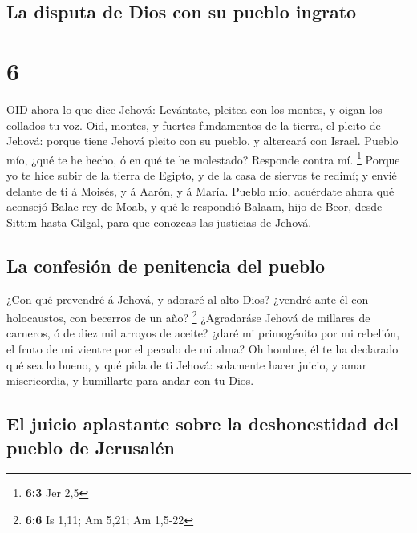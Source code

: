 \hypertarget{la-disputa-de-dios-con-su-pueblo-ingrato}{%
\subsection{La disputa de Dios con su pueblo
ingrato}\label{la-disputa-de-dios-con-su-pueblo-ingrato}}

\hypertarget{section-5}{%
\section{6}\label{section-5}}

 OID ahora lo que dice Jehová: Levántate, pleitea con los
montes, y oigan los collados tu voz.  Oid, montes, y fuertes
fundamentos de la tierra, el pleito de Jehová: porque tiene Jehová
pleito con su pueblo, y altercará con Israel.  Pueblo mío,
¿qué te he hecho, ó en qué te he molestado? Responde contra mí.
\footnote{\textbf{6:3} Jer 2,5}  Porque yo te hice subir de
la tierra de Egipto, y de la casa de siervos te redimí; y envié delante
de ti á Moisés, y á Aarón, y á María.  Pueblo mío, acuérdate
ahora qué aconsejó Balac rey de Moab, y qué le respondió Balaam, hijo de
Beor, desde Sittim hasta Gilgal, para que conozcas las justicias de
Jehová.

\hypertarget{la-confesiuxf3n-de-penitencia-del-pueblo}{%
\subsection{La confesión de penitencia del
pueblo}\label{la-confesiuxf3n-de-penitencia-del-pueblo}}

 ¿Con qué prevendré á Jehová, y adoraré al alto Dios?
¿vendré ante él con holocaustos, con becerros de un año? \footnote{\textbf{6:6}
  Is 1,11; Am 5,21; Am 1,5-22}  ¿Agradaráse Jehová de
millares de carneros, ó de diez mil arroyos de aceite? ¿daré mi
primogénito por mi rebelión, el fruto de mi vientre por el pecado de mi
alma?  Oh hombre, él te ha declarado qué sea lo bueno, y qué
pida de ti Jehová: solamente hacer juicio, y amar misericordia, y
humillarte para andar con tu Dios.

\hypertarget{el-juicio-aplastante-sobre-la-deshonestidad-del-pueblo-de-jerusaluxe9n}{%
\subsection{El juicio aplastante sobre la deshonestidad del pueblo de
Jerusalén}\label{el-juicio-aplastante-sobre-la-deshonestidad-del-pueblo-de-jerusaluxe9n}}

